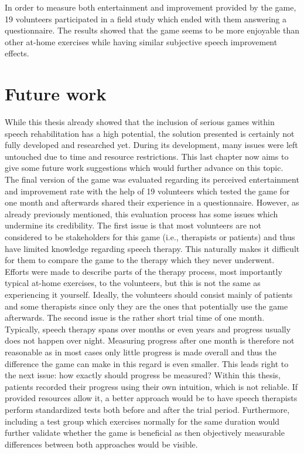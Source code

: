 \documentclass[draft,final]{vutinfth} %
\begin{document}
In order to measure both entertainment and improvement provided by the game, 19 volunteers participated in a field study which ended with them answering a questionnaire. The results showed that the game seems to be more enjoyable than other at-home exercises while having similar subjective speech improvement effects.

\section{Future work}
While this thesis already showed that the inclusion of serious games within speech rehabilitation has a high potential, the solution presented is certainly not fully developed and researched yet. During its development, many issues were left untouched due to time and resource restrictions. This last chapter now aims to give some future work suggestions which would further advance on this topic. \\

The final version of the game was evaluated regarding its perceived entertainment and improvement rate with the help of 19 volunteers which tested the game for one month and afterwards shared their experience in a questionnaire. However, as already previously mentioned, this evaluation process has some issues which undermine its credibility. The first issue is that most volunteers are not considered to be stakeholders for this game (i.e., therapists or patients) and thus have limited knowledge regarding speech therapy. This naturally makes it difficult for them to compare the game to the therapy which they never underwent. Efforts were made to describe parts of the therapy process, most importantly typical at-home exercises, to the volunteers, but this is not the same as experiencing it yourself. Ideally, the volunteers should consist mainly of patients and some therapists since only they are the ones that potentially use the game afterwards. The second issue is the rather short trial time of one month. Typically, speech therapy spans over months or even years and progress usually does not happen over night. Measuring progress after one month is therefore not reasonable as in most cases only little progress is made overall and thus the difference the game can make in this regard is even smaller. This leads right to the next issue: how exactly should progress be measured? Within this thesis, patients recorded their progress using their own intuition, which is not reliable. If provided resources allow it, a better approach would be to have speech therapists perform standardized tests both before and after the trial period. Furthermore, including a test group which exercises normally for the same duration would further validate whether the game is beneficial as then objectively measurable differences between both approaches would be visible. \\
\end{document}
